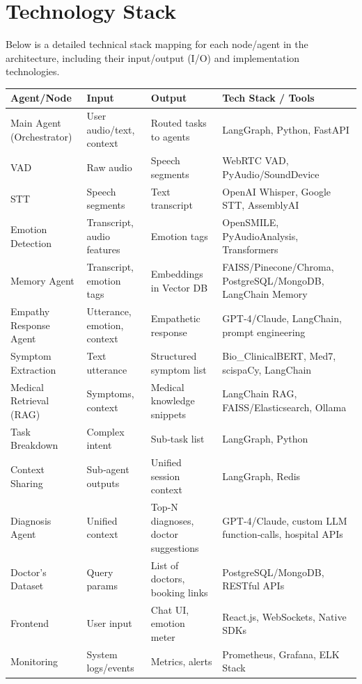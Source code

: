 \documentclass[11pt,a4paper]{article}
\begin{document}
\section{Technology Stack}
Below is a detailed technical stack mapping for each node/agent in the architecture, including their input/output (I/O) and implementation technologies.

\begin{longtable}{@{}p{}p{}p{}p{}@{}}
\toprule
\textbf{Agent/Node} & \textbf{Input} & \textbf{Output} & \textbf{Tech Stack / Tools} \\
\midrule
\endhead

Main Agent (Orchestrator) & User audio/text, context & Routed tasks to agents & LangGraph, Python, FastAPI \\
VAD & Raw audio & Speech segments & WebRTC VAD, PyAudio/SoundDevice \\
STT & Speech segments & Text transcript & OpenAI Whisper, Google STT, AssemblyAI \\
Emotion Detection & Transcript, audio features & Emotion tags & OpenSMILE, PyAudioAnalysis, Transformers \\
Memory Agent & Transcript, emotion tags & Embeddings in Vector DB & FAISS/Pinecone/Chroma, PostgreSQL/MongoDB, LangChain Memory \\
Empathy Response Agent & Utterance, emotion, context & Empathetic response & GPT‐4/Claude, LangChain, prompt engineering \\
Symptom Extraction & Text utterance & Structured symptom list & Bio\_ClinicalBERT, Med7, scispaCy, LangChain \\
Medical Retrieval (RAG) & Symptoms, context & Medical knowledge snippets & LangChain RAG, FAISS/Elasticsearch, Ollama \\
Task Breakdown & Complex intent & Sub‐task list & LangGraph, Python \\
Context Sharing & Sub‐agent outputs & Unified session context & LangGraph, Redis \\
Diagnosis Agent & Unified context & Top‐N diagnoses, doctor suggestions & GPT‐4/Claude, custom LLM function‐calls, hospital APIs \\
Doctor’s Dataset & Query params & List of doctors, booking links & PostgreSQL/MongoDB, RESTful APIs \\
Frontend & User input & Chat UI, emotion meter & React.js, WebSockets, Native SDKs \\
Monitoring & System logs/events & Metrics, alerts & Prometheus, Grafana, ELK Stack \\
\bottomrule
\end{longtable}
\end{document}
